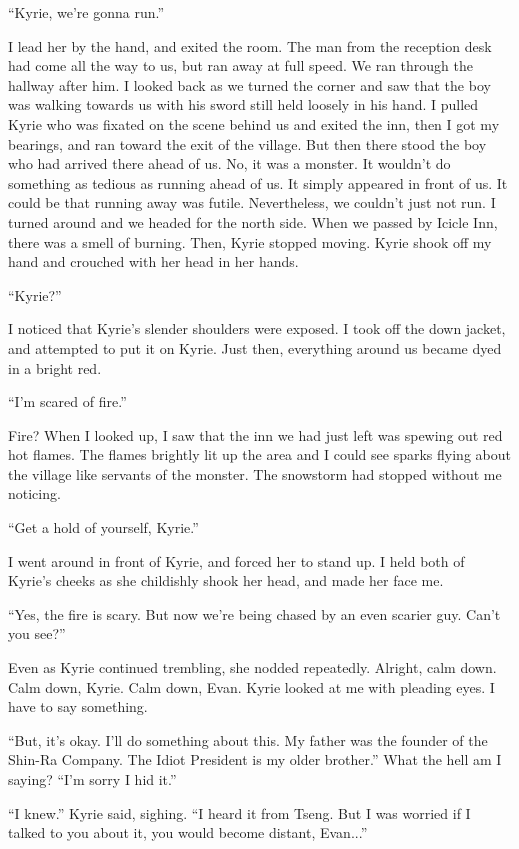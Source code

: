 \documentclass[oneside]{book}
\begin{document}
“Kyrie, we’re gonna run.”

I lead her by the hand, and exited the room. The man from the reception desk had come all the way to us, but ran away at full speed. We ran through the hallway after him. I looked back as we turned the corner and saw that the boy was walking towards us with his sword still held loosely in his hand. I pulled Kyrie who was fixated on the scene behind us and exited the inn, then I got my bearings, and ran toward the exit of the village. But then there stood the boy who had arrived there ahead of us. No, it was a monster. It wouldn’t do something as tedious as running ahead of us. It simply appeared in front of us. It could be that running away was futile. Nevertheless, we couldn’t just not run. I turned around and we headed for the north side. When we passed by Icicle Inn, there was a smell of burning. Then, Kyrie stopped moving. Kyrie shook off my hand and crouched with her head in her hands.

“Kyrie?”

I noticed that Kyrie’s slender shoulders were exposed. I took off the down jacket, and attempted to put it on Kyrie. Just then, everything around us became dyed in a bright red.

“I’m scared of fire.”

Fire? When I looked up, I saw that the inn we had just left was spewing out red hot flames. The flames brightly lit up the area and I could see sparks flying about the village like servants of the monster. The snowstorm had stopped without me noticing.

“Get a hold of yourself, Kyrie.”

I went around in front of Kyrie, and forced her to stand up. I held both of Kyrie’s cheeks as she childishly shook her head, and made her face me.

“Yes, the fire is scary. But now we’re being chased by an even scarier guy. Can’t you see?”

Even as Kyrie continued trembling, she nodded repeatedly. Alright, calm down. Calm down, Kyrie. Calm down, Evan. Kyrie looked at me with pleading eyes. I have to say something.

“But, it’s okay. I’ll do something about this. My father was the founder of the Shin-Ra Company. The Idiot President is my older brother.” What the hell am I saying? “I’m sorry I hid it.”

“I knew.” Kyrie said, sighing. “I heard it from Tseng. But I was worried if I talked to you about it, you would become distant, Evan...”
\end{document}
